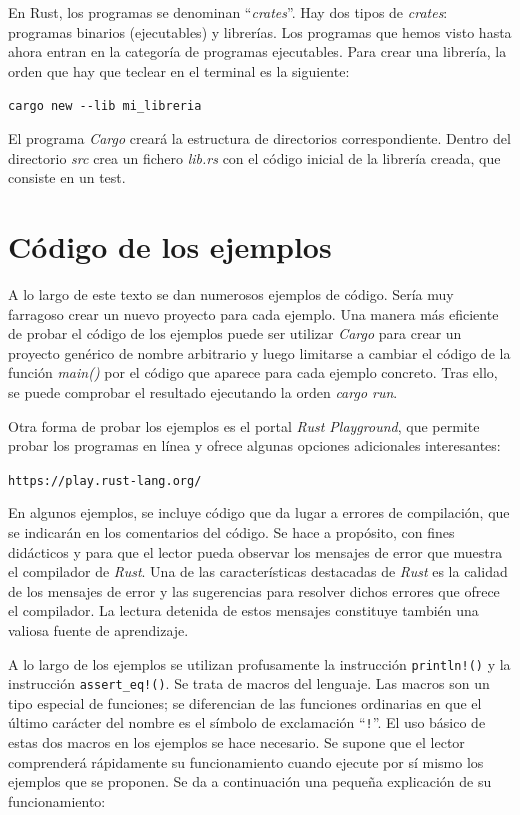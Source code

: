 En Rust, los programas se denominan ``\textit{crates}''. Hay dos tipos de \textit{crates}: programas binarios (ejecutables) y librerías. Los programas que hemos visto hasta ahora entran en la categoría de programas ejecutables. Para crear una librería, la orden que hay que teclear en el terminal es la siguiente:

{\centering\texttt{cargo new {-}{-}lib mi\_libreria}\par}

El programa \textit{Cargo} creará la estructura de directorios correspondiente. Dentro del directorio \textit{src} crea un fichero \textit{lib.rs} con el código inicial de la librería creada, que consiste en un test. 

\section{Código de los ejemplos}
\label{sec_codigo_ejemplos}
\noindent A lo largo de este texto se dan numerosos ejemplos de código. Sería muy farragoso crear un nuevo proyecto para cada ejemplo. Una manera más eficiente de probar el código de los ejemplos puede ser utilizar \textit{Cargo} para crear un proyecto genérico de nombre arbitrario y luego limitarse a cambiar el código de la función \textit{main()} por el código que aparece para cada ejemplo concreto. Tras ello, se puede comprobar el resultado ejecutando la orden \textit{cargo run}.

Otra forma de probar los ejemplos es el portal \textit{Rust Playground}, que permite probar los programas en línea y ofrece algunas opciones adicionales interesantes:

{\centering \texttt{https://play.rust-lang.org/} \par}

En algunos ejemplos, se incluye código que da lugar a errores de compilación, que se indicarán en los comentarios del código. Se hace a propósito, con fines didácticos y para que el lector pueda observar los mensajes de error que muestra el compilador de \textit{Rust}. Una de las características destacadas de \textit{Rust} es la calidad de los mensajes de error y las sugerencias para resolver dichos errores que ofrece el compilador. La lectura detenida de estos mensajes constituye también una valiosa fuente de aprendizaje.

A lo largo de los ejemplos se utilizan profusamente la instrucción \texttt{println!()} y la instrucción  \texttt{assert\_eq!()}. Se trata de macros del lenguaje. Las macros son un tipo especial de funciones; se diferencian de las funciones ordinarias en que el último carácter del nombre es el símbolo de exclamación ``\texttt{!}''. El uso básico de estas dos macros en los ejemplos se hace necesario. Se supone que el lector comprenderá rápidamente su funcionamiento cuando ejecute por sí mismo los ejemplos que se proponen. Se da a continuación una pequeña explicación de su funcionamiento:

